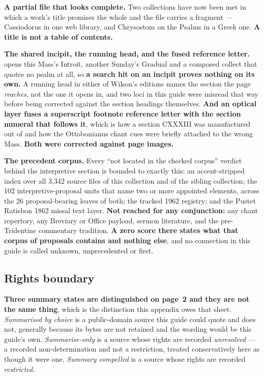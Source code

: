 \textbf{A partial file that looks complete.} Two collections have now been met
in which a work's title promises the whole and the file carries a fragment ---
Cassiodorus in one web library, and Chrysostom on the Psalms in a Greek one.
\textbf{A title is not a table of contents.}

\textbf{The shared incipit, the running head, and the fused reference letter.}
 opens this Mass's Introit, another
Sunday's Gradual and a composed collect that quotes no psalm at all, so
\textbf{a search hit on an incipit proves nothing on its own.} A running head in
either of Wilson's editions names the section the page \emph{reaches}, not the
one it opens in, and two loci in this guide were misread that way before being
corrected against the section headings themselves. \textbf{And an optical layer
fuses a superscript footnote reference letter with the section numeral that
follows it}, which is how a section CXXXIII was manufactured out of
 and how the Ottobonianus chant cues were briefly attached to the
wrong Mass. \textbf{Both were corrected against page images.}

\textbf{The precedent corpus.} Every ``not located in the checked corpus''
verdict behind the interpretive section is bounded to exactly this: an
accent-stripped index over all 3,342 source files of this collection and of the
sibling collection; the 102 interpretive-proposal units that name two or more
appointed elements, across the 26 proposal-bearing leaves of both; the tracked
1962 registry; and the Pustet Ratisbon 1862 missal text layer. \textbf{Not
reached for any conjunction:} any chant repertory, any Breviary or Office
payload, sermon literature, and the pre-Tridentine commentary tradition.
\textbf{A zero score there states what that corpus of proposals contains and
nothing else}, and no connection in this guide is called unknown, unprecedented
or first.

\subsection*{Rights boundary}

\textbf{Three summary states are distinguished on page~2 and they are not the
same thing}, which is the distinction this appendix owes that sheet.
\emph{Summarised by choice} is a public-domain source this guide could quote and
does not, generally because its bytes are not retained and the wording would be
this guide's own. \emph{Summarise-only} is a source whose rights are recorded
\emph{unresolved} --- a recorded non-determination and not a restriction, treated
conservatively here as though it were one. \emph{Summary compelled} is a source
whose rights are recorded \emph{restricted}.


